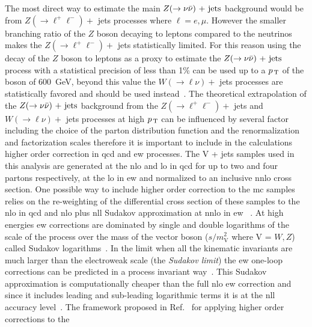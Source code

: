 The most direct way to estimate the main $Z (\rightarrow \nu \bar{\nu})\mathrm{~+~jets}$ background would be
from $Z (\rightarrow \ell^+ \ell^-) +$ jets processes where $\ell = e, \mu$.
However the smaller branching ratio of the $Z$ boson decaying to leptons
compared to the neutrinos makes the $Z (\rightarrow \ell^+ \ell^-) +$ jets
statistically limited. For this reason using the decay of the $Z$ boson to
leptons as a proxy to estimate the $Z (\rightarrow \nu \bar{\nu})\mathrm{~+~jets}$ process with a statistical
precision of less than 1\% can be used up to a $p_\mathrm{\, T}$ of the boson of 600~GeV,
beyond this value the $W(\rightarrow \ell \nu) +$ jets processes are
statistically favored and should be used
instead~\cite{VplusJetsCorrections}. The theoretical extrapolation of the
$Z (\rightarrow \nu \bar{\nu})\mathrm{~+~jets}$ background from the $Z (\rightarrow \ell^+ \ell^-) +$ jets and
$W(\rightarrow \ell \nu) +$ jets processes at high $p_\mathrm{\, T}$ can be influenced by
several factor including the choice of the parton distribution function and the
renormalization and factorization scales therefore it is important to include in
the calculations higher order correction in \gls{qcd} and \gls{ew}
processes. The V + jets samples used in this analysis are generated at the
\gls{nlo} and \gls{lo} in \gls{qcd} for up to two and four partons respectively,
at the \gls{lo} in \gls{ew} and normalized to an inclusive \gls{nnlo} cross
section. One possible way to include higher order correction to the \gls{mc}
samples relies on the re-weighting of the differential cross section of these
samples to the \gls{nlo}  in \gls{qcd} and \gls{nlo} plus \gls{nll} Sudakov
approximation at \gls{nnlo} in \gls{ew} ~\cite{VplusJetsCorrections}. At high energies \gls{ew} corrections
are dominated by single and double logarithms of the scale of the process over
the mass of the vector boson ($s/m_\mathrm{V}^2$ where V = $W, Z$) called
Sudakov logarithms~\cite{SudakovLogs}. In the limit when all the kinematic
invariants are much larger than the electroweak scale (the \emph{Sudakov limit})
the \gls{ew} one-loop corrections can be predicted in a process invariant
way~\cite{SudakovApproximation}. This Sudakov approximation is computationally
cheaper than the full \gls{nlo} \gls{ew} correction and since it includes
leading and sub-leading logarithmic terms it is at the \gls{nll} accuracy
level~\cite{SudakovApproximation}. The framework proposed in
Ref.~\cite{VplusJetsCorrections} for applying higher order corrections to the
